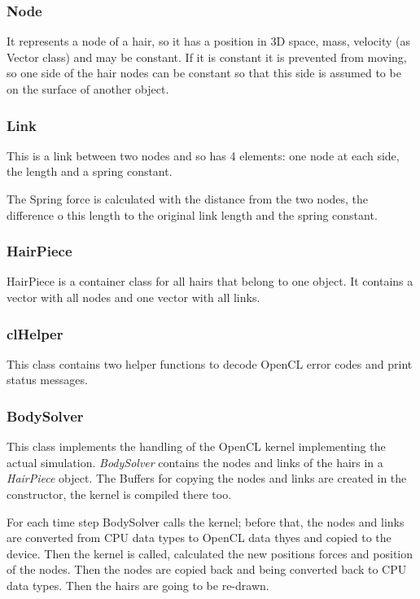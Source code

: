 \documentclass[11pt,a4paper]{scrartcl}
\begin{document}
\subsubsection{Node}
It represents a node of a hair, so it has a position in 3D space, mass, velocity (as Vector class) and may be constant. If it is constant it is prevented from moving, so one side of the hair nodes can be constant so that this side is assumed to be on the surface of another object.

\subsubsection{Link}
This is a link between two nodes and so has 4 elements: one node at each side, the length and a spring constant.

The Spring force is calculated with the distance from the two nodes, the difference o this length to the original link length and the spring constant.

\subsubsection{HairPiece}
HairPiece is a container class for all hairs that belong to one object. It contains a vector with all nodes and one vector with all links.

\subsubsection{clHelper}
This class contains two helper functions to decode OpenCL error codes and print status messages.

\subsubsection{BodySolver}
This class implements the handling of the OpenCL kernel implementing the actual simulation. \textit{BodySolver} contains the nodes and links of the hairs in a \textit{HairPiece} object. The Buffers for copying the nodes and links are created in the constructor, the kernel is compiled there too.

For each time step BodySolver calls the kernel; before that, the nodes and links are converted from CPU data types to OpenCL data thyes and copied to the device. Then the kernel is called, calculated the new positions forces and position of the nodes. Then the nodes are copied back and being converted back to CPU data types. Then the hairs are going to be re-drawn.
\end{document}
